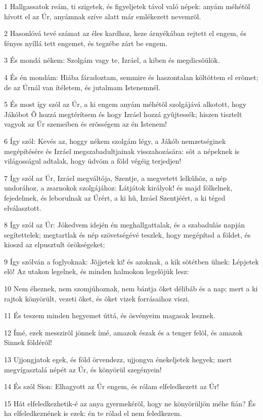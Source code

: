 \par 1 Hallgassatok reám, ti szigetek, és figyeljetek távol való népek: anyám méhétõl hívott el az Úr, anyámnak szíve alatt már emlékezett nevemrõl.
\par 2 Hasonlóvá tevé számat az éles kardhoz, keze árnyékában rejtett el engem, és fényes nyíllá tett engemet, és tegzébe zárt be engem.
\par 3 És mondá nékem: Szolgám vagy te, Izráel, a kiben és megdicsõülök.
\par 4 És én mondám: Hiába fáradoztam, semmire és haszontalan költöttem el erõmet; de az Úrnál van ítéletem, és jutalmam Istenemnél.
\par 5 És most így szól az Úr, a ki engem anyám méhétõl szolgájává alkotott, hogy Jákóbot Õ hozzá megtérítsem és hogy Izráel hozzá gyûjtessék; hiszen tisztelt vagyok az Úr szemeiben és erõsségem az én Istenem!
\par 6 Így szól: Kevés az, hoggy nékem szolgám légy, a Jákób nemzetséginek megépítésére és Izráel megszabadultjainak visszahozására: sõt a népeknek is világosságul adtalak, hogy üdvöm a föld végéig terjedjen!
\par 7 Így szól az Úr, Izráel megváltója, Szentje, a megvetett lelkûhöz, a nép undorához, a zsarnokok szolgájához: Látjátok királyok! és majd fölkelnek, fejedelmek, és leborulnak az Úrért, a ki hû, Izráel Szentjéért, a ki téged elválasztott.
\par 8 Így szól az Úr: Jókedvem idején én meghallgattalak, és a szabadulás napján segítettelek; megtartlak és nép szövetségévé teszlek, hogy megépítsd a földet, és kioszd az elpusztult örökségeket;
\par 9 Így szólván a foglyoknak: Jõjjetek ki! és azoknak, a kik sötétben ülnek: Lépjetek elõ! Az utakon legelnek, és minden halmokon legelõjük lesz:
\par 10 Nem éheznek, nem szomjúhoznak, nem bántja õket délibáb és a nap; mert a ki rajtok könyörült, vezeti õket, és õket vizek forrásaihoz viszi.
\par 11 És teszem minden hegyemet úttá, és ösvényeim magasak lesznek.
\par 12 Ímé, ezek messzirõl jönnek ímé, amazok észak és a tenger felõl, és amazok Sinnek földérõl!
\par 13 Ujjongjatok egek, és föld örvendezz, ujjongva énekeljetek hegyek; mert megvígasztalá népét az Úr, és könyörül szegényein!
\par 14 És szól Sion: Elhagyott az Úr engem, és rólam elfeledkezett az Úr!
\par 15 Hát elfeledkezhetik-é az anya gyermekérõl, hogy ne könyörüljön méhe fián? És ha elfeledkeznének is ezek: én te rólad el nem feledkezem.
